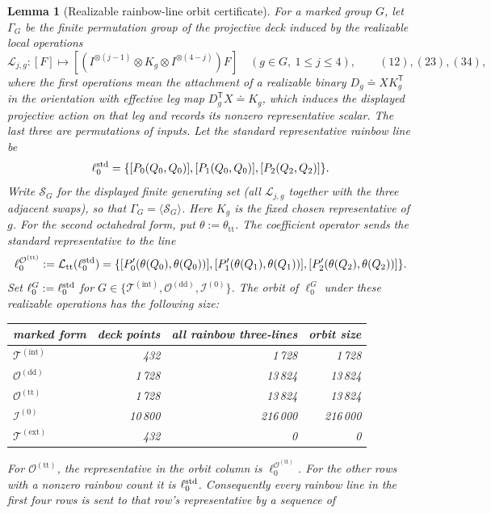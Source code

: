 \documentclass[11pt,letterpaper,onecolumn]{article}
\theoremstyle{plain}
\newtheorem{lemma}[lemma]{Lemma}
\theoremstyle{definition}
\theoremstyle{remark}
\newcommand{\TetInt}{{\mathcal T^{(\mathrm{int})}}}
\newcommand{\TetExt}{{\mathcal T^{(\mathrm{ext})}}}
\newcommand{\OctDD}{{\mathcal O^{(\mathrm{dd})}}}
\newcommand{\OctTT}{{\mathcal O^{(\mathrm{tt})}}}
\newcommand{\IcoZero}{{\mathcal I^{(0)}}}
\begin{document}
\begin{lemma}[Realizable rainbow-line orbit certificate]
\label{lem:platonic-rainbow-orbit}
For a marked group \(G\), let \(\Gamma_G\) be the finite
permutation group of the projective deck induced by the realizable local
operations
\[
 \mathscr L_{j,g}:[F]\longmapsto
 [(I^{\otimes(j-1)}\otimes K_g\otimes
 I^{\otimes(4-j)})F]
 \quad(g\in G,\ 1\le j\le4),
 \qquad (12),(23),(34),
\]
where the first operations mean the attachment of a realizable binary
\(D_g\doteq X K_g^{\mathsf T}\) in the orientation with effective leg map
\(D_g^{\mathsf T}X\doteq K_g\), which induces the displayed projective
action on that leg and records its nonzero representative scalar. The last three are permutations of inputs.  Let the standard representative rainbow line be
\[
 \ell_0^{\rm std}
 =\{[P_0(Q_0,Q_0)],[P_1(Q_0,Q_0)],[P_2(Q_2,Q_2)]\}.
\]
Write \(\mathscr S_G\) for the displayed finite generating set (all
\(\mathscr L_{j,g}\) together with the three adjacent swaps), so that
\(\Gamma_G=\langle\mathscr S_G\rangle\).  Here \(K_g\) is the fixed chosen representative of \(g\).  For the second
octahedral form, put \(\theta:=\theta_{\mathrm{tt}}\). The coefficient operator sends
the standard representative to the line
\[
\ell_0^{\OctTT}:=\mathcal L_{\mathrm{tt}}(\ell_0^{\rm std})
 =\{[P'_0(\theta(Q_0),\theta(Q_0))],
     [P'_1(\theta(Q_1),\theta(Q_1))],
      [P'_2(\theta(Q_2),\theta(Q_2))]\}.
\]
Set
\(\ell_0^G:=\ell_0^{\rm std}\) for
\(G\in\{\TetInt,\OctDD,\IcoZero\}\).  The orbit of \(\ell_0^G\) under these realizable operations has the following
size:
\begin{center}
\normalsize
\begin{tabular}{lrrr}
\toprule
marked form & deck points & all rainbow three-lines & orbit size\\
\midrule
\(\TetInt\) & 432 & 1\,728 & 1\,728\\
\(\OctDD\) & 1\,728 & 13\,824 & 13\,824\\
\(\OctTT\) & 1\,728 & 13\,824 & 13\,824\\
\(\IcoZero\) & 10\,800 & 216\,000 & 216\,000\\
\(\TetExt\) & 432 & 0 & 0\\
\bottomrule
\end{tabular}
\end{center}
For \(\OctTT\), the representative in the orbit column is
\(\ell_0^{\OctTT}\). For the other rows with a nonzero rainbow count it
is \(\ell_0^{\rm std}\).  Consequently every rainbow line in the first four rows is
sent to that row's representative by a sequence of

\end{lemma}
\end{document}
